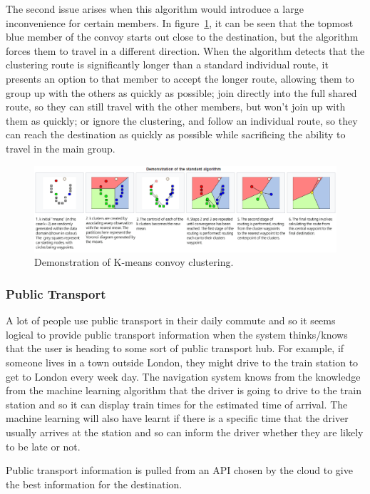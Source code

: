 \documentclass{article}
\begin{document}
The second issue arises when this algorithm would introduce a large inconvenience for certain members. In figure~\ref{nav-kmeans}, it can be seen that the topmost blue member of the convoy starts out close to the destination, but the algorithm forces them to travel in a different direction. When the algorithm detects that the clustering route is significantly longer than a standard individual route, it presents an option to that member to accept the longer route, allowing them to group up with the others as quickly as possible; join directly into the full shared route, so they can still travel with the other members, but won't join up with them as quickly; or ignore the clustering, and follow an individual route, so they can reach the destination as quickly as possible while sacrificing the ability to travel in the main group.

\begin{figure}[H]
  \centering
  \includegraphics[scale=0.55]{kmeanscluster}
  \caption{Demonstration of K-means convoy clustering.}\label{nav-kmeans}
\end{figure}

\subsubsection{Public Transport}
A lot of people use public transport in their daily commute and so it seems logical to provide public transport information when the system thinks/knows that the user is heading to some sort of public transport hub. For example, if someone lives in a town outside London, they might drive to the train station to get to London every week day. The navigation system knows from the knowledge from the machine learning algorithm that the driver is going to drive to the train station and so it can display train times for the estimated time of arrival. The machine learning will also have learnt if there is a specific time that the driver usually arrives at the station and so can inform the driver whether they are likely to be late or not.

Public transport information is pulled from an API chosen by the cloud to give the best information for the destination.
\end{document}

